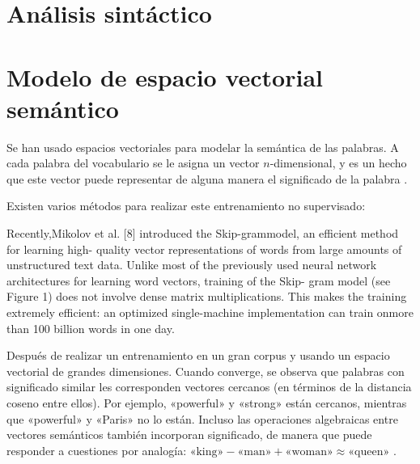 \section{Análisis sintáctico}

\section{Modelo de espacio vectorial semántico}

Se han usado espacios vectoriales para modelar la semántica de las palabras. A cada palabra del vocabulario se le asigna un vector $n$-dimensional, y es un hecho que este vector puede representar de alguna manera el significado de la palabra \citep{Socher2012}.

Existen varios métodos para realizar este entrenamiento no supervisado:
\begin{description}
\item[]
\end{description}
Recently,Mikolov et al. [8] introduced the Skip-grammodel, an efficient method for learning high- quality vector representations of words from large amounts of unstructured text data. Unlike most of the previously used neural network architectures for learning word vectors, training of the Skip- gram model (see Figure 1) does not involve dense matrix multiplications. This makes the training extremely efficient: an optimized single-machine implementation can train onmore than 100 billion words in one day.


Después de realizar un entrenamiento en un gran corpus y usando un espacio vectorial de grandes dimensiones. Cuando converge, se observa que palabras con significado similar les corresponden vectores cercanos (en términos de la distancia coseno entre ellos). Por ejemplo, «powerful» y «strong» están cercanos, mientras que «powerful» y «Paris» no lo están. Incluso las operaciones algebraicas entre vectores semánticos también incorporan significado, de manera que puede responder a cuestiones por analogía:
$\text{«king»} - \text{«man»} + \text{«woman»} \approx \text{«queen»}$
\citep{DBLP:journals/corr/LeM14}.
